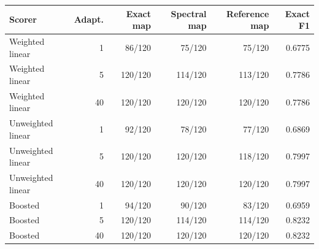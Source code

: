 \begin{tabularx}{\linewidth}{@{}Yrrrrr@{}}\toprule
Scorer & Adapt. & Exact map & Spectral map & Reference map & Exact F1 \\\midrule
Weighted linear & 1 & 86/120 & 75/120 & 75/120 & 0.6775 \\
Weighted linear & 5 & 120/120 & 114/120 & 113/120 & 0.7786 \\
Weighted linear & 40 & 120/120 & 120/120 & 120/120 & 0.7786 \\
Unweighted linear & 1 & 92/120 & 78/120 & 77/120 & 0.6869 \\
Unweighted linear & 5 & 120/120 & 120/120 & 118/120 & 0.7997 \\
Unweighted linear & 40 & 120/120 & 120/120 & 120/120 & 0.7997 \\
Boosted & 1 & 94/120 & 90/120 & 83/120 & 0.6959 \\
Boosted & 5 & 120/120 & 114/120 & 114/120 & 0.8232 \\
Boosted & 40 & 120/120 & 120/120 & 120/120 & 0.8232 \\
\bottomrule\end{tabularx}
